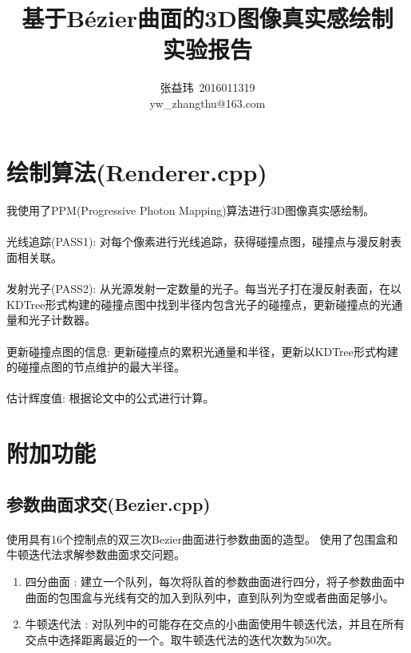 \documentclass[12pt]{article}
\title{基于Bézier曲面的3D图像真实感绘制\\实验报告}
\author{张益玮~2016011319\\yw\_zhangthu@163.com}
\date{}
\begin{document}
\kaishu
\maketitle
\section{绘制算法(Renderer.cpp)}
\paragraph{} 我使用了PPM(Progressive Photon Mapping)算法进行3D图像真实感绘制。
\paragraph{} 光线追踪(PASS1): 对每个像素进行光线追踪，获得碰撞点图，碰撞点与漫反射表面相关联。
\paragraph{} 发射光子(PASS2): 从光源发射一定数量的光子。每当光子打在漫反射表面，在以KDTree形式构建的碰撞点图中找到半径内包含光子的碰撞点，更新碰撞点的光通量和光子计数器。
\paragraph{} 更新碰撞点图的信息: 更新碰撞点的累积光通量和半径，更新以KDTree形式构建的碰撞点图的节点维护的最大半径。
\paragraph{} 估计辉度值: 根据论文中的公式进行计算。

\section{附加功能}
\subsection{参数曲面求交(Bezier.cpp)}
\paragraph{} 使用具有16个控制点的双三次Bezier曲面进行参数曲面的造型。 使用了包围盒和牛顿迭代法求解参数曲面求交问题。
\begin{enumerate}
\item {四分曲面} : 建立一个队列，每次将队首的参数曲面进行四分，将子参数曲面中曲面的包围盒与光线有交的加入到队列中，直到队列为空或者曲面足够小。
\item {牛顿迭代法} : 对队列中的可能存在交点的小曲面使用牛顿迭代法，并且在所有交点中选择距离最近的一个。取牛顿迭代法的迭代次数为50次。
\end{enumerate}
\end{document}
